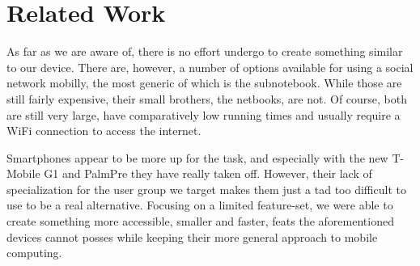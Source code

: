 %
%
%
\section{Related Work}
As far as we are aware of, there is no effort undergo to create something similar to our device. There are,
however, a number of options available for using a social network mobilly, the most generic of which is the 
subnotebook. While those are still fairly expensive, their small brothers, the netbooks, are not. Of course,
both are still very large, have comparatively low running times and usually require a WiFi connection to 
access the internet. 

Smartphones appear to be more up for the task, and especially with the new T-Mobile G1 and 
Palm\registered Pre they have really taken off. However, their lack of specialization for the user 
group we target makes them just a tad too difficult to use to be a real alternative. 
Focusing on a limited feature-set, we were able to create something more accessible, smaller and 
faster, feats the aforementioned devices cannot posses while keeping their more general approach to 
mobile computing.
